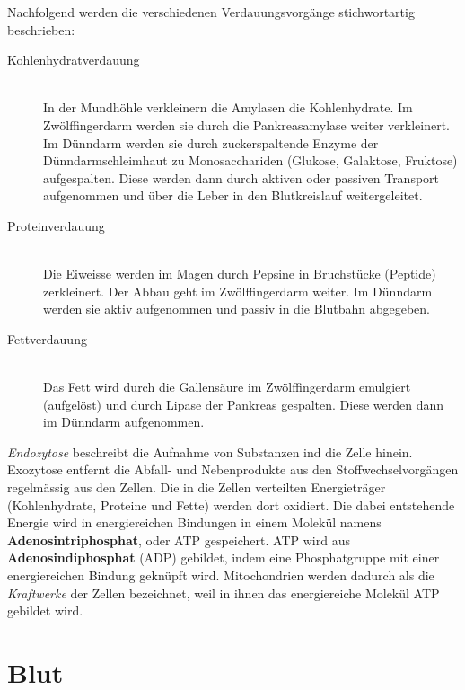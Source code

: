 Nachfolgend werden die verschiedenen Verdauungsvorgänge stichwortartig beschrieben:
\begin{description}
	\item[Kohlenhydratverdauung] \hfil  \\
	In der Mundhöhle verkleinern die Amylasen die Kohlenhydrate. Im Zwölffingerdarm werden sie durch die Pankreasamylase weiter verkleinert. Im Dünndarm werden sie durch zuckerspaltende Enzyme der Dünndarmschleimhaut zu Monosacchariden (Glukose, Galaktose, Fruktose) aufgespalten. Diese werden dann durch aktiven oder passiven Transport aufgenommen und über die Leber in den Blutkreislauf weitergeleitet.
	
	\item[Proteinverdauung] \hfil \\
	Die Eiweisse werden im Magen durch Pepsine in Bruchstücke (Peptide) zerkleinert. Der Abbau geht im Zwölffingerdarm weiter. Im Dünndarm werden sie aktiv aufgenommen und passiv in die Blutbahn abgegeben.
	
	\item[Fettverdauung] \hfil \\
	Das Fett wird durch die Gallensäure im Zwölffingerdarm emulgiert (aufgelöst) und durch Lipase der Pankreas gespalten. Diese werden dann im Dünndarm aufgenommen.
\end{description}
\textit{Endozytose} beschreibt die Aufnahme von Substanzen ind die Zelle hinein. Exozytose entfernt die Abfall- und Nebenprodukte aus den Stoffwechselvorgängen regelmässig aus den Zellen. Die in die Zellen verteilten Energieträger (Kohlenhydrate, Proteine und Fette) werden dort oxidiert. Die dabei entstehende Energie wird in energiereichen Bindungen in einem Molekül namens \textbf{Adenosintriphosphat}, oder ATP gespeichert. ATP wird aus \textbf{Adenosindiphosphat} (ADP) gebildet, indem eine Phosphatgruppe mit einer energiereichen Bindung geknüpft wird. Mitochondrien werden dadurch als die \textit{Kraftwerke} der Zellen bezeichnet, weil in ihnen das energiereiche Molekül ATP gebildet wird.

\newpage

\section{Blut}

